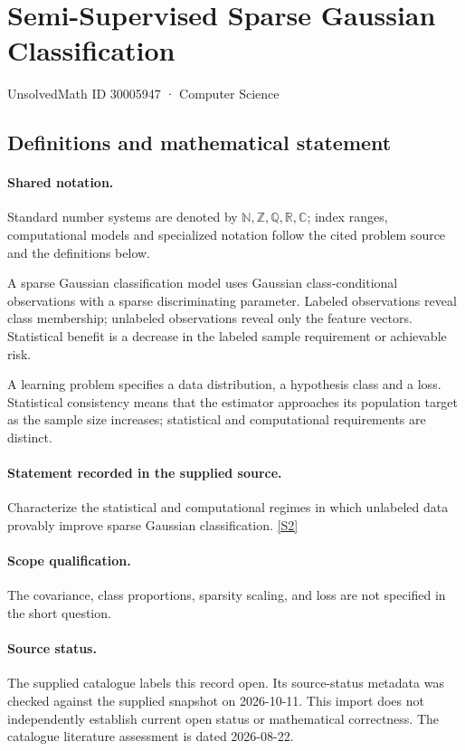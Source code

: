 \documentclass[11pt]{article}
\newcommand{\sref}[2]{\hyperlink{source:#1:#2}{[S#2]}}
\begin{document}
\setcounter{section}{30005946}
\section{Semi-Supervised Sparse Gaussian Classification}\label{30005947}
{\small\sffamily UnsolvedMath ID 30005947 · Computer Science}
\subsection{Definitions and mathematical statement}

\paragraph{Shared notation.}Standard number systems are denoted by $\mathbb N,\mathbb Z,\mathbb Q,\mathbb R,\mathbb C$; index ranges, computational models and specialized notation follow the cited problem source and the definitions below.


A sparse Gaussian classification model uses Gaussian class-conditional observations with a sparse discriminating parameter. Labeled observations reveal class membership; unlabeled observations reveal only the feature vectors. Statistical benefit is a decrease in the labeled sample requirement or achievable risk.

A learning problem specifies a data distribution, a hypothesis class and a loss. Statistical consistency means that the estimator approaches its population target as the sample size increases; statistical and computational requirements are distinct.
\paragraph{Statement recorded in the supplied source.}
Characterize the statistical and computational regimes in which unlabeled data provably improve sparse Gaussian classification. \sref{30005947}{2}
\paragraph{Scope qualification.}
The covariance, class proportions, sparsity scaling, and loss are not specified in the short question.
\paragraph{Source status.}
The supplied catalogue labels this record open. Its source-status metadata was checked against the supplied snapshot on 2026-10-11. This import does not independently establish current open status or mathematical correctness. The catalogue literature assessment is dated 2026-08-22.
\end{document}
